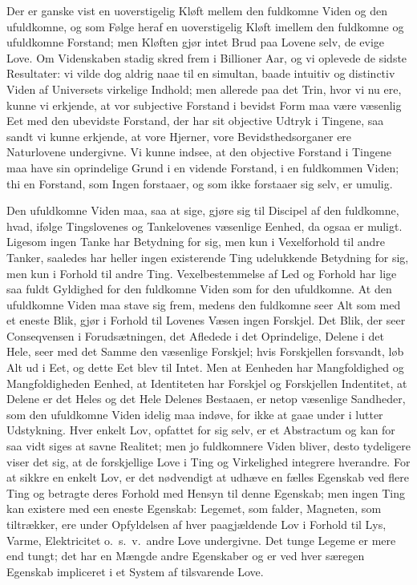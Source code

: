 \documentclass[12pt]{book}
\newcommand{\apage}[1]{\marginnote{\footnotesize\textit{[#1]}}}
\begin{document}
Der er ganske vist en uoverstigelig Kløft mellem den fuldkomne Viden og den
ufuldkomne, og som Følge heraf en uoverstigelig Kløft imellem den
fuldkomne og ufuldkomne Forstand; men Kløften gjør intet Brud paa Lovene
selv, de evige Love. Om Videnskaben stadig skred frem i Billioner Aar, og
vi oplevede de sidste Resultater: vi vilde dog aldrig naae til en simultan,
baade intuitiv og distinctiv Viden af Universets virkelige Indhold; men
allerede paa det Trin, hvor vi nu ere, kunne vi erkjende, at vor subjective
Forstand i bevidst Form maa være væsenlig Eet med den ubevidste Forstand,
der har sit objective Udtryk i Tingene, saa sandt vi kunne erkjende, at
vore Hjerner, vore Bevidsthedsorganer ere Naturlovene undergivne. Vi kunne
indsee, at den objective Forstand i Tingene maa have sin oprindelige Grund
i en vidende Forstand, i en fuldkommen Viden; thi en Forstand, som Ingen
forstaaer, og som ikke forstaaer sig selv, er umulig.

Den ufuldkomne Viden maa, saa at sige, gjøre sig til Discipel af den
fuldkomne, hvad, ifølge Tingslovenes og Tankelovenes væsenlige Eenhed, da
ogsaa er muligt. Ligesom ingen Tanke har Betydning for \apage{68} sig, men kun i
Vexelforhold til andre Tanker, saaledes har heller ingen existerende Ting
udelukkende Betydning for sig, men kun i Forhold til andre Ting.
Vexelbestemmelse af Led og Forhold har lige saa fuldt Gyldighed for den
fuldkomne Viden som for den ufuldkomne. At den ufuldkomne Viden maa stave
sig frem, medens den fuldkomne seer Alt som med et eneste Blik, gjør i
Forhold til Lovenes Væsen ingen Forskjel. Det Blik, der seer Conseqvensen i
Forudsætningen, det Afledede i det Oprindelige, Delene i det Hele, seer med
det Samme den væsenlige Forskjel; hvis Forskjellen forsvandt, løb Alt ud i
Eet, og dette Eet blev til Intet. Men at Eenheden har Mangfoldighed og
Mangfoldigheden Eenhed, at Identiteten har Forskjel og Forskjellen
Indentitet, at Delene er det Heles og det Hele Delenes Bestaaen, er netop
væsenlige Sandheder, som den ufuldkomne Viden idelig maa indøve, for ikke
at gaae under i lutter Udstykning. Hver enkelt Lov, opfattet for sig selv,
er et Abstractum og kan for saa vidt siges at savne Realitet; men jo
fuldkomnere Viden bliver, desto tydeligere viser det sig, at de
forskjellige Love i Ting og Virkelighed integrere hverandre. For at sikkre
en enkelt Lov, er det nødvendigt at udhæve en fælles Egenskab ved flere
Ting og betragte deres Forhold med Hensyn til denne Egenskab; men ingen
Ting kan existere med een eneste Egenskab: Legemet, som falder, Magneten,
som tiltrækker, ere under Opfyldelsen af hver paagjældende Lov i Forhold
til Lys, Varme, Elektricitet o.\ s.\ v.\ andre Love undergivne. Det tunge
Legeme er mere end tungt; det har en Mængde andre \apage{69} Egenskaber og er ved
hver særegen Egenskab impliceret i et System af tilsvarende Love.
\end{document}

